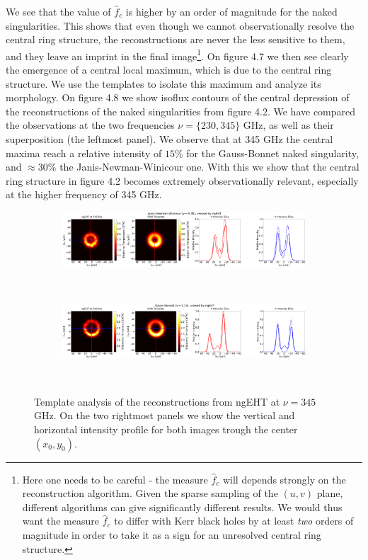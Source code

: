 \documentclass[12pt]{article}
\numberwithin{equation}{section}
\numberwithin{figure}{section}
\begin{document}
	\newpage
	We see that the value of $\hat{f}_c$ is higher by an order of magnitude for the naked singularities. This shows that even though we cannot observationally resolve the central ring structure, the reconstructions are never the less sensitive to them, and they leave an imprint in the final image\footnote{Here one needs to be careful - the measure $\hat{f}_c$ will depends strongly on the reconstruction algorithm. Given the sparse sampling of the $(u,v)$ plane, different algorithms can give significantly different results. We would thus want the measure $\hat{f}_c$ to differ with Kerr black holes by at least \emph{two} orders of magnitude in order to take it as a sign for an unresolved central ring structure.}. On figure 4.7 we then see clearly the emergence of a central local maximum, which is due to the central ring structure. We use the templates to isolate this maximum and analyze its morphology. On figure 4.8 we show isoflux contours of the central depression of the reconstructions of the naked singularities from figure 4.2. We have compared the observations at the two frequencies $\nu = \{230, 345\}$ GHz, as well as their superposition (the leftmost panel). We observe that at 345 GHz the central maxima reach a relative intensity of $15\%$ for the Gauss-Bonnet naked singularity, and $\approx 30\%$ the Janis-Newman-Winicour one. With this we show that the central ring structure in figure 4.2 becomes extremely observationally relevant, especially at the higher frequency of 345 GHz. 
	
	\begin{figure}[h!]
		\centering
		\begin{subfigure}{12cm}
			\hspace{-1.5cm}
			\includegraphics[scale = 0.13]{Section_8_Observing_Horizonless_Objects/Ehtim_Vida_plot_ngEHT_345_JNW.png}
		\end{subfigure}\\
		\begin{subfigure}{12cm}
			\hspace{-1.5cm}
			\includegraphics[scale = 0.13]{Section_8_Observing_Horizonless_Objects/Ehtim_Vida_plot_ngEHT_345_GB.png}
		\end{subfigure}\\
		\label{VIDA_ngEHT_230}
		\caption[Template analysis of the reconstructions from ngEHT at $\nu= 345$ GHz.]{\small Template analysis of the reconstructions from ngEHT at $\nu= 345$ GHz. On the two rightmost panels we show the vertical and horizontal intensity profile for both images trough the center $(x_0,y_0)$.} 
	\end{figure}
	
\end{document}
